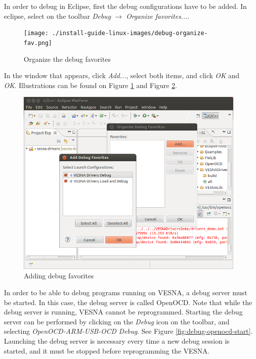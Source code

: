 \documentclass[a4paper, 10pt]{article}
\begin{document}
In order to debug in Eclipse, first the debug configurations have to be added.
In eclipse, select on the toolbar \emph{Debug} $\rightarrow$ \emph{Organize favorites...}.

    \begin{figure}[H]
    \centering
        \texttt{[image: ./install-guide-linux-images/debug-organize-fav.png]}
        \caption{Organize the debug favorites}
        \label{fig:debug-org-fav}
    \end{figure}


In the window that appears, click \emph{Add...},
select both items, and click \emph{OK} and \emph{OK}. Illustrations can be found on
Figure \ref{fig:debug-org-fav} and Figure \ref{fig:debug-add-fav}.

    \begin{figure}[H]
    \centering
        \includegraphics[width=\textwidth]{./install-guide-linux-images/debug-add-fav.png}
        \caption{Adding debug favorites}
        \label{fig:debug-add-fav}
    \end{figure}

In order to be able to debug programs running on VESNA,
a debug server must be started.
In this case, the debug server is called OpenOCD.
Note that while the debug server is running, VESNA cannot be reprogrammed.
Starting the debug server can be performed by clicking on the
\emph{Debug} icon on the toolbar, and selecting
\emph{OpenOCD-ARM-USB-OCD Debug}.
See Figure \ref{fig:debug-openocd-start}.
Launching the debug server is necessary every time a new debug session is started,
and it must be stopped before reprogramming the VESNA.
\end{document}
